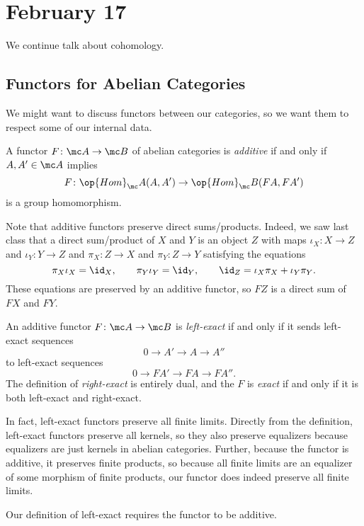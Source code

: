 \documentclass[../notes.tex]{subfiles}
\begin{document}
\section{February 17}

We continue talk about cohomology.

\subsection{Functors for Abelian Categories}
We might want to discuss functors between our categories, so we want them to respect some of our internal data.
\begin{definition}[additive]
	A functor $F\colon\mc A\to\mc B$ of abelian categories is \textit{additive} if and only if $A,A'\in\mc A$ implies
	\[F\colon\op{Hom}_\mc A(A,A')\to\op{Hom}_\mc B(FA,FA')\]
	is a group homomorphism.
\end{definition}
\begin{remark}
	Note that additive functors preserve direct sums/products. Indeed, we saw last class that a direct sum/product of $X$ and $Y$ is an object $Z$ with maps $\iota_X\colon X\to Z$ and $\iota_Y\colon Y\to Z$ and $\pi_X\colon Z\to X$ and $\pi_Y\colon Z\to Y$ satisfying the equations
	\[\pi_X\iota_X=\id_X,\qquad\pi_Y\iota_Y=\id_Y,\qquad\id_Z=\iota_X\pi_X+\iota_Y\pi_Y.\]
	These equations are preserved by an additive functor, so $FZ$ is a direct sum of $FX$ and $FY$.
\end{remark}
\begin{definition}[exact]
	An additive functor $F\colon\mc A\to\mc B$ is \textit{left-exact} if and only if it sends left-exact sequences
	\[0\to A'\to A\to A''\]
	to left-exact sequences
	\[0\to FA'\to FA\to FA''.\]
	The definition of \textit{right-exact} is entirely dual, and the $F$ is \textit{exact} if and only if it is both left-exact and right-exact.
\end{definition}
\begin{remark}
	In fact, left-exact functors preserve all finite limits. Directly from the definition, left-exact functors preserve all kernels, so they also preserve equalizers because equalizers are just kernels in abelian categories. Further, because the functor is additive, it preserves finite products, so because all finite limits are an equalizer of some morphism of finite products, our functor does indeed preserve all finite limits.
\end{remark}
\begin{warn}
	Our definition of left-exact requires the functor to be additive.
\end{warn}
\end{document}
